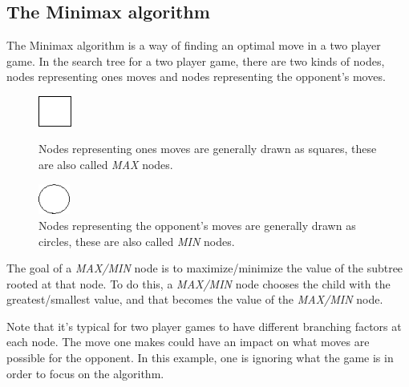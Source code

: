 \label{second part}
\subsection{The Minimax algorithm}
The Minimax algorithm is a way of finding an optimal move in a two player game. In the search tree for a two player game, there are two kinds of nodes, nodes representing ones moves and nodes representing the opponent's moves.\cite{graphics_minimax}
\begin{figure}[H]
\centering
	\begin{minipage}[b]{0.45\linewidth}
		\centering
		\includegraphics[height=1cm]{2_State_of_the_art/Arimaa_on_MCTS_Benoit/img/max.png}
		\caption{\label{fig:max}Nodes representing ones moves are generally drawn as squares, these are also called \emph{MAX} nodes.}
	\end{minipage}%
	\hspace*{1cm}
	\begin{minipage}[b]{0.45\linewidth}
		\centering
		\includegraphics[height=1cm]{2_State_of_the_art/Arimaa_on_MCTS_Benoit/img/min.png}
		\caption{\label{fig:min}Nodes representing the opponent's moves are generally drawn as circles, these are also called \emph{MIN} nodes.}
	\end{minipage}%
\end{figure}

The goal of a \emph{MAX/MIN} node is to maximize/minimize the value of the subtree rooted at that node. To do this, a \emph{MAX/MIN} node chooses the child with the greatest/smallest value, and that becomes the value of the \emph{MAX/MIN} node.

Note that it's typical for two player games to have different branching factors at each node. The move one makes could have an impact on what moves are possible for the opponent. In this example, one is ignoring what the game is in order to focus on the algorithm.

